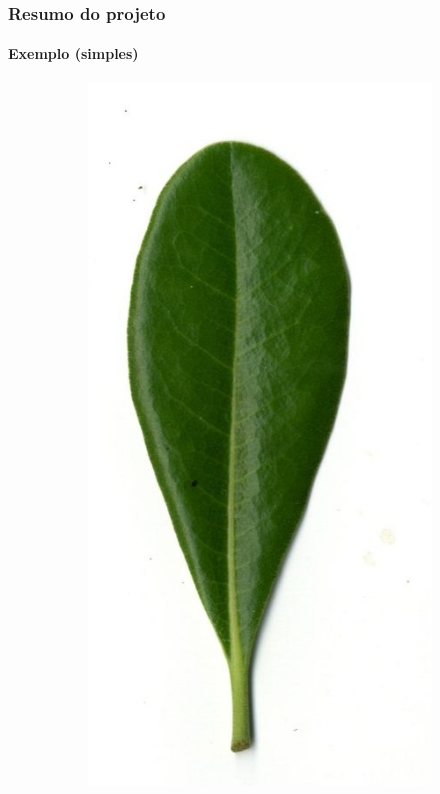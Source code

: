 \begin{frame}
	\frametitle{Resumo do projeto}
	\framesubtitle{Exemplo (simples)}
	
	\begin{figure}[ht!]
		\centering
		\begin{subfigure}[b]{0.19\textwidth}
			\centering
			\includegraphics[width=\textwidth]{img/original.jpg}

\end{subfigure}
\end{figure}
\end{frame}
